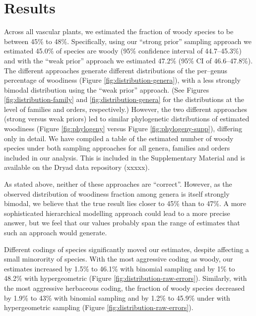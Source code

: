 \documentclass[a4paper,12pt]{article}
\begin{document}
\section{Results}

Across all vascular plants, we estimated the fraction of woody species
to be between 45\% to 48\%.
Specifically, using our ``strong prior'' sampling approach we
estimated 45.0\% of species are woody (95\% confidence interval of
44.7--45.3\%) and with the ``weak prior'' approach we estimated 47.2\%
(95\% CI of 46.6--47.8\%).
The different approaches generate different distributions of the
per--genus percentage of woodiness (Figure
\ref{fig:distribution-genera}), with a less strongly bimodal
distribution using the ``weak prior'' approach. (See Figures
\ref{fig:distribution-family} and \ref{fig:distribution-genera} 
for the distributions at the level of families and orders, respectively.) 
However, the two different approaches (strong
versus weak priors) led to similar phylogenetic distributions of
estimated woodiness (Figure \ref{fig:phylogeny} versus Figure
\ref{fig:phylogeny-supp}), differing only in detail. We have compiled
a table of the estimated number of woody species under both sampling
approaches for all genera, families and orders included in our analysis.
This is included in the Supplementary Material and is available on the 
Dryad data repository (xxxxx).

As stated above, neither of these approaches are ``correct''. However,
as the observed distribution of woodiness fraction among genera is
itself strongly bimodal, we believe that the true result lies closer
to 45\% than to 47\%.  A more sophisticated hierarchical modelling
approach could lead to a more precise answer, but we feel that our
values probably span the range of estimates that such an approach
would generate.

Different codings of species significantly moved our estimates,
despite affecting a small minorority of species.  With the most
aggressive coding as woody, our estimates 
increased by 1.5\% to 46.1\% with binomial sampling 
and by 1\% to 48.2\% with hypergeometric (Figure
\ref{fig:distribution-raw-errors}).  Similarly, with the most
aggressive herbaceous coding, the fraction of woody species
decreased by 1.9\% to 43\% with binomial sampling
and by 1.2\% to 45.9\% under with hypergeometric sampling (Figure
\ref{fig:distribution-raw-errors}).
\end{document}
